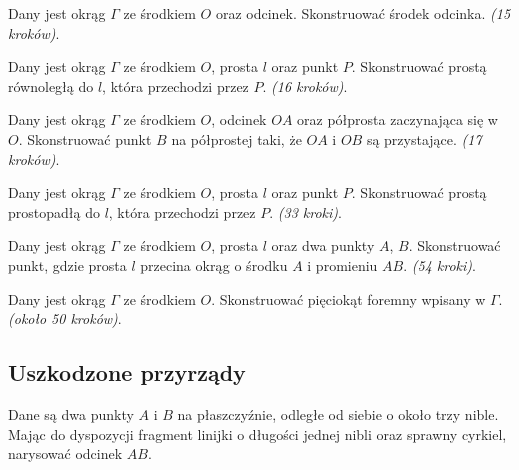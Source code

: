 \begin{problem}
    Dany jest okrąg $\Gamma$ ze środkiem $O$ oraz odcinek.
    Skonstruować środek odcinka. \hfill \emph{(15 kroków)}. %
\end{problem}

\begin{problem}
    Dany jest okrąg $\Gamma$ ze środkiem $O$, prosta $l$ oraz punkt $P$.
    Skonstruować prostą równoległą do $l$, która przechodzi przez $P$. \hfill \emph{(16 kroków)}. %
\end{problem}

\begin{problem}
    Dany jest okrąg $\Gamma$ ze środkiem $O$, odcinek $OA$ oraz półprosta zaczynająca się w $O$.
    Skonstruować punkt $B$ na półprostej taki, że $OA$ i $OB$ są przystające. \hfill \emph{(17 kroków)}. %
\end{problem}

\begin{problem}
    Dany jest okrąg $\Gamma$ ze środkiem $O$, prosta $l$ oraz punkt $P$.
    Skonstruować prostą prostopadłą do $l$, która przechodzi przez $P$. \hfill \emph{(33 kroki)}. %
\end{problem}

\begin{problem}
    Dany jest okrąg $\Gamma$ ze środkiem $O$, prosta $l$ oraz dwa punkty $A$, $B$.
    Skonstruować punkt, gdzie prosta $l$ przecina okrąg o środku $A$ i promieniu $AB$. \hfill \emph{(54 kroki)}. %
\end{problem}

\begin{problem}
    Dany jest okrąg $\Gamma$ ze środkiem $O$.
    Skonstruować pięciokąt foremny wpisany w $\Gamma$. \hfill \emph{(około 50 kroków)}. %
\end{problem}

\subsection{Uszkodzone przyrządy}
\begin{problem}
    Dane są dwa punkty $A$ i $B$ na płaszczyźnie, odległe od siebie o około trzy nible.
    Mając do dyspozycji fragment linijki o długości jednej nibli oraz sprawny cyrkiel, narysować odcinek $AB$.
\end{problem}

